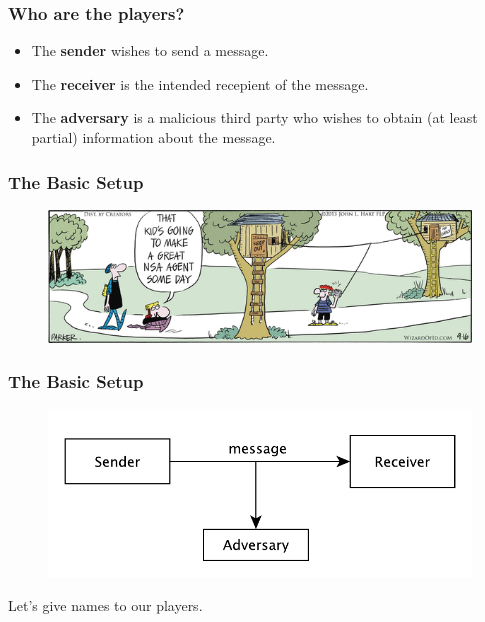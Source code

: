 \documentclass{beamer}
\newcommand{\<}{\langle}
\renewcommand{\>}{\rangle}
\begin{document}
\begin{frame}
\frametitle{Who are the players?}

\begin{itemize}
\item The \textbf{sender} wishes to send a message.
\item The \textbf{receiver} is the intended recepient of the message.
\item The \textbf{adversary} is a malicious third party who wishes to obtain (at least partial) information about the message. 
\end{itemize}
\end{frame}

\begin{frame}
\frametitle{The Basic Setup}

\begin{figure}
\includegraphics[scale=.5]{IMG/comic1.png}
\caption{\url{}}
\end{figure}
\end{frame}

\begin{frame}
\frametitle{The Basic Setup}

\begin{figure}
\includegraphics[scale=.8]{IMG/diag1.pdf}
\end{figure}

Let's give names to our players.
\end{frame}
\end{document}
